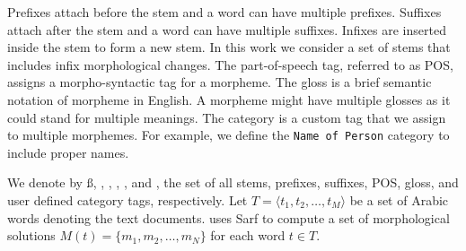Prefixes attach before the stem and a word can have multiple prefixes. 
Suffixes attach after the stem and a word can have multiple suffixes. 
Infixes are inserted inside the stem to form a new stem. 
In this work we consider a set of stems that includes infix morphological changes. 
The part-of-speech tag, referred to as POS, 
assigns a morpho-syntactic tag for a morpheme. 
The gloss is a brief semantic notation of morpheme in English. 
A morpheme might have multiple glosses as it could stand for multiple meanings. 
The category is a custom tag that we assign to multiple morphemes. 
For example, we define the {\tt Name of Person} category to include proper names.

We denote by 
\ss,
\pp,
\xx,
\PP,
\GG, and 
\AC, the set of 
all stems,
prefixes,
suffixes,
POS,
gloss, 
and user defined category tags, respectively. 
Let $T=\langle t_1,t_2,\ldots,t_M\rangle$ be a set of Arabic words denoting the 
text documents. 
\framework uses Sarf to compute a set of morphological solutions $M(t)=\{m_1,m_2,\ldots,m_N\}$
for each word $t\in T$. 
%

\begin{table}[tb!]
  \centering
  \caption{Sample solution vector for .}
  \label{tab:samplesolution}%
\end{table}%


